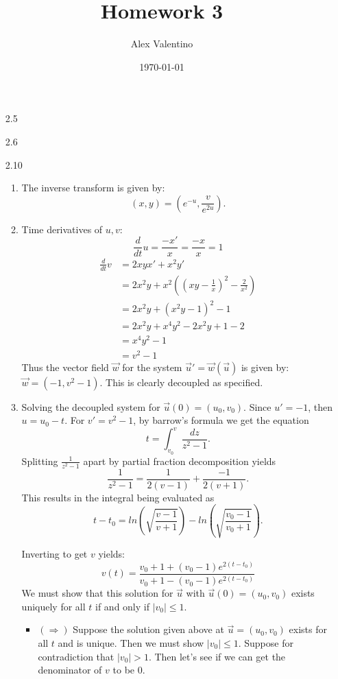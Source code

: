 \documentclass[12pt, letterpaper]{article}
\date{\today}
\author{Alex Valentino}
\title{Homework 3}
\begin{document}
\begin{enumerate}
	\item[2.5]
	\item[2.6]
	\item[2.10]
	\begin{enumerate}
		\item The inverse transform is given by:
		$$
		(x,y) = (e^{-u}, \frac{v}{e^{2u}}).
		$$
		\item Time derivatives of $u,v$:
			$$
				\frac{d}{dt}u = \frac{-x'}{x} = \frac{-x}{x} = 1                                                                              
			$$
			\begin{align*}
			\frac{d}{dt}v &= 2xy x' + x^2 y'\\
			&= 2x^2 y + x^2((xy-\frac{1}{x})^2 -\frac{2}{x^2})\\	
			&= 2x^2 y + (x^2y -1)^2 - 1\\
			&= 2x^2 y + x^4y^2 -2x^2y + 1 - 2\\
			&= x^4y^2 -1\\
			&= v^2 - 1
			\end{align*}
			Thus the vector field $\vec{w}$ for the system $\Vec{u}' = \Vec{w}(\Vec{u})$ is given by:
			$\Vec{w} = (-1,v^2 -1)$.  This is clearly decoupled as specified.
		\item Solving the decoupled system for $\Vec{u}(0) = (u_0,v_0)$.  
			Since $u' = -1$, then $u = u_0 - t.$  For $v' = v^2 - 1$, by barrow's formula we get the equation
			$$
				t = \int_{v_0}^v \frac{dz}{z^2 - 1}.		
			$$
			Splitting $\frac{1}{z^2 - 1}$ apart by partial fraction decomposition yields
			$$
				\frac{1}{z^2 - 1} =  \frac{1}{2(v-1)} + \frac{-1}{2(v+1)}.
			$$
			This results in the integral being evaluated as 
			$$
				t - t_0 = ln\left(\sqrt{\frac{v-1}{v+1}}\right) - ln(\sqrt{\frac{v_0-1}{v_0 + 1}}).			
			$$
			\iffalse
			Note that $ln\left(\sqrt{\frac{v+1}{1-v}}\right) = artanh(v)$, therefore we can directly express $v$ now:
			$$
				v = tanh(artanh(v_0) - t).			
			$$
			\fi
			Inverting to get $v$ yields:
		$$
			v(t) = \frac{v_0+1+(v_0-1)e^{2(t-t_0)}}{v_0+1-(v_0-1)e^{2(t-t_0)}}		
		$$
			We must show that this solution for $\Vec{u}$ with $\Vec{u}(0) = (u_0,v_0)$ exists uniquely for all $t$ if and only if $|v_0| \leq 1$.
			\begin{itemize}
				\item $(\Rightarrow)$  Suppose the solution given above at $\Vec{u} = (u_0, v_0)$ exists for all $t$ and is unique.  Then we must show $|v_0| \leq 1$.  Suppose for contradiction that $|v_0| > 1$. Then let's see if we can get the denominator of $v$ to be $0$.  

\end{itemize}
\end{enumerate}
\end{enumerate}
\end{document}
